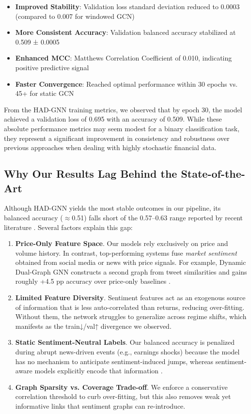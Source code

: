 \documentclass[12pt]{article}
\begin{document}
\begin{itemize}
    \item \textbf{Improved Stability}: Validation loss standard deviation reduced to 0.0003 (compared to 0.007 for windowed GCN)
    \item \textbf{More Consistent Accuracy}: Validation balanced accuracy stabilized at 0.509 ± 0.0005
    \item \textbf{Enhanced MCC}: Matthews Correlation Coefficient of 0.010, indicating positive predictive signal
    \item \textbf{Faster Convergence}: Reached optimal performance within 30 epochs vs. 45+ for static GCN
\end{itemize}

From the HAD-GNN training metrics, we observed that by epoch 30, the model achieved a validation loss of 0.695 with an accuracy of 0.509. While these absolute performance metrics may seem modest for a binary classification task, they represent a significant improvement in consistency and robustness over previous approaches when dealing with highly stochastic financial data.

\subsection{Why Our Results Lag Behind the State-of-the-Art}

Although HAD-GNN yields the most stable outcomes in our pipeline, its balanced accuracy ($\approx$0.51) falls short of the 0.57–0.63 range reported by recent literature \cite{du2023,zhang2024,liu2025}. Several factors explain this gap:

\begin{enumerate}[label=(\arabic*)]
    \item \textbf{Price-Only Feature Space}.  
          Our models rely exclusively on price and volume history.  
          In contrast, top-performing systems fuse \emph{market sentiment} obtained from social media or news with price signals.  
          For example, Dynamic Dual-Graph GNN constructs a second graph from tweet similarities and gains roughly +4.5 pp accuracy over price-only baselines \cite{du2023}.
    \item \textbf{Limited Feature Diversity}.  
          Sentiment features act as an exogenous source of information that is less auto-correlated than returns, reducing over-fitting.  
          Without them, the network struggles to generalize across regime shifts, which manifests as the train↓/val↑ divergence we observed.
    \item \textbf{Static Sentiment-Neutral Labels}.  
          Our balanced accuracy is penalized during abrupt news-driven events (e.g., earnings shocks) because the model has no mechanism to anticipate sentiment-induced jumps, whereas sentiment-aware models explicitly encode that information \cite{zhang2024}.
    \item \textbf{Graph Sparsity vs. Coverage Trade-off}.  
          We enforce a conservative correlation threshold to curb over-fitting, but this also removes weak yet informative links that sentiment graphs can re-introduce.
\end{enumerate}
\end{document}
